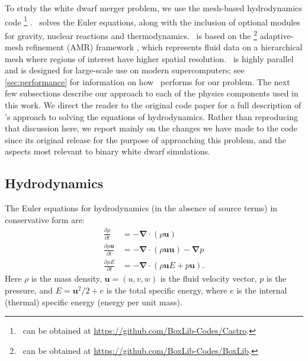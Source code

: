 \documentclass[12pt]{article}
\begin{document}
To study the white dwarf merger problem, we use the mesh-based
hydrodynamics code \castro\footnote{\castro\ can be obtained at
\url{https://github.com/BoxLib-Codes/Castro}.} \citep{castro}.
\castro\ solves the Euler equations, along with the inclusion of optional modules for gravity,
nuclear reactions and thermodynamics. \castro\ is based on the \boxlib
\footnote{\boxlib\ can be obtained at \url{https://github.com/BoxLib-Codes/BoxLib}.}
adaptive-mesh refinement (AMR) framework \citep{rendleman:2000,boxlib-tiling}, which
represents fluid data on a hierarchical mesh where regions of interest have higher
spatial resolution. \castro\ is highly parallel and is designed for
large-scale use on modern supercomputers; see
\autoref{sec:performance} for information on how \castro\ performs for our
problem. The next few subsections describe our approach to each of the
physics components used in this work. We direct the reader to the
original code paper for a full description of \castro's approach to
solving the equations of hydrodynamics. Rather than reproducing that
discussion here, we report mainly on the changes we have made to the
code since its original release for the purpose of approaching this problem,
and the aspects most relevant to binary white dwarf simulations.

\subsection{Hydrodynamics}
\label{sec:hydrodynamics}

The Euler equations for hydrodynamics (in the absence of source terms) in conservative form are:
\begin{align}
  \frac{\partial \rho}{\partial t} &= -\bm{\nabla} \cdot (\rho \mathbf{u}) \label{eq:euler_density}\\
  \frac{\partial \rho \mathbf{u}}{\partial t} &= -\bm{\nabla} \cdot (\rho \mathbf{u}\mathbf{u}) - \bm{\nabla}p \label{eq:euler_momentum}\\
  \frac{\partial \rho E}{\partial t} &= -\bm{\nabla}\cdot(\rho\mathbf{u}E + p\mathbf{u}). \label{eq:euler_energy}
\end{align}
Here $\rho$ is the mass density, $\mathbf{u} = (u, v, w)$ is the fluid velocity
vector, $p$ is the pressure, and $E = \mathbf{u}^2 / 2 + e$ is the
total specific energy, where $e$ is the internal (thermal) specific
energy (energy per unit mass).
\end{document}
